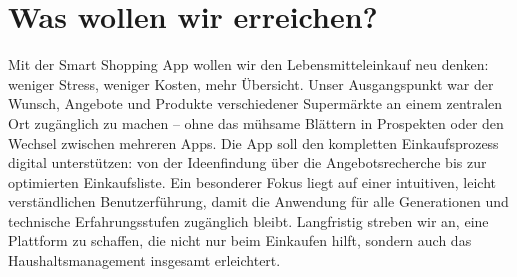 \section{Was wollen wir erreichen?}
Mit der Smart Shopping App wollen wir den Lebensmitteleinkauf neu denken: weniger Stress, weniger Kosten, mehr Übersicht. Unser Ausgangspunkt war der Wunsch, Angebote und Produkte verschiedener Supermärkte an einem zentralen Ort zugänglich zu machen – ohne das mühsame Blättern in Prospekten oder den Wechsel zwischen mehreren Apps. Die App soll den kompletten Einkaufsprozess digital unterstützen: von der Ideenfindung über die Angebotsrecherche bis zur optimierten Einkaufsliste. Ein besonderer Fokus liegt auf einer intuitiven, leicht verständlichen Benutzerführung, damit die Anwendung für alle Generationen und technische Erfahrungsstufen zugänglich bleibt. Langfristig streben wir an, eine Plattform zu schaffen, die nicht nur beim Einkaufen hilft, sondern auch das Haushaltsmanagement insgesamt erleichtert.
